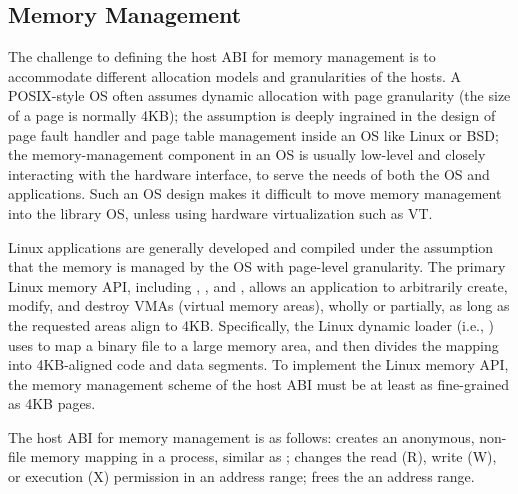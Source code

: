 \subsection{Memory Management}
\label{sec:abi:memory}


The challenge to defining the host ABI for memory management
is to accommodate different allocation models and granularities of the hosts.
A POSIX-style OS often assumes dynamic allocation with page granularity (the size of a page is normally 4KB);
the assumption is deeply ingrained in the design of page fault handler and page table management
inside an OS like Linux or BSD;
the memory-management component in an OS
is usually low-level and closely interacting with the hardware interface,
to serve the needs of both the OS and applications.
Such an OS design makes it difficult to move memory management
into the library OS, unless using hardware virtualization such as VT.



Linux applications 
are generally developed and compiled under the assumption that the memory is managed
by the OS with page-level granularity.
The primary Linux memory API,
including , , and ,
allows an application
to arbitrarily create, modify, and destroy VMAs (virtual memory areas),
wholly or partially,
as long as the requested areas align to
4KB.
Specifically, the Linux dynamic loader (i.e., ) %
uses  to map a binary file to a large memory area,
and then divides the mapping into 4KB-aligned code and data segments.
To implement the Linux memory API,
the memory management scheme of the host ABI
must be at least as fine-grained as 4KB pages.


The host ABI for memory management is as follows:
 creates an anonymous, non-file memory mapping in a process, similar as ;
 changes the read (R), write (W), or execution (X) permission in an address range;
 frees the an address range.




